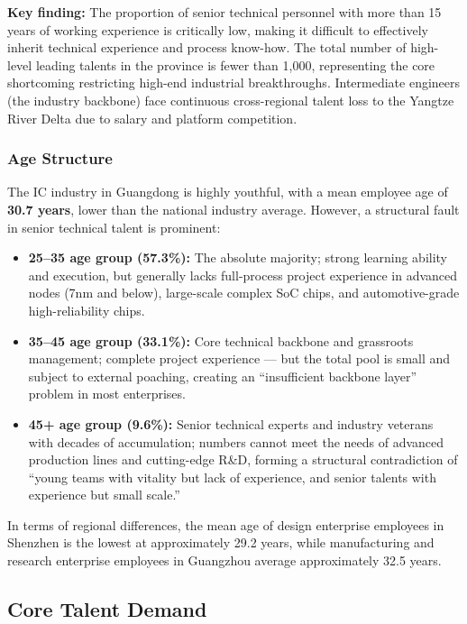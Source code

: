 \documentclass[12pt,a4paper]{article}
\begin{document}
\textbf{Key finding:} The proportion of senior technical personnel with more
than 15 years of working experience is critically low, making it difficult to
effectively inherit technical experience and process know-how. The total number
of high-level leading talents in the province is fewer than 1,000, representing
the core shortcoming restricting high-end industrial breakthroughs. Intermediate
engineers (the industry backbone) face continuous cross-regional talent loss
to the Yangtze River Delta due to salary and platform competition.

\subsubsection{Age Structure}

The IC industry in Guangdong is highly youthful, with a mean employee age of
\textbf{30.7 years}, lower than the national industry average. However, a
structural fault in senior technical talent is prominent:

\begin{itemize}
    \item \textbf{25--35 age group (57.3\%):} The absolute majority; strong
          learning ability and execution, but generally lacks full-process
          project experience in advanced nodes (7nm and below), large-scale
          complex SoC chips, and automotive-grade high-reliability chips.
    \item \textbf{35--45 age group (33.1\%):} Core technical backbone and
          grassroots management; complete project experience — but the total
          pool is small and subject to external poaching, creating an
          ``insufficient backbone layer'' problem in most enterprises.
    \item \textbf{45+ age group (9.6\%):} Senior technical experts and industry
          veterans with decades of accumulation; numbers cannot meet the needs
          of advanced production lines and cutting-edge R\&D, forming a
          structural contradiction of ``young teams with vitality but lack of
          experience, and senior talents with experience but small scale.''
\end{itemize}

In terms of regional differences, the mean age of design enterprise employees
in Shenzhen is the lowest at approximately 29.2 years, while manufacturing
and research enterprise employees in Guangzhou average approximately 32.5 years.

\subsection{Core Talent Demand}
\label{sec:talent_demand}
\end{document}
